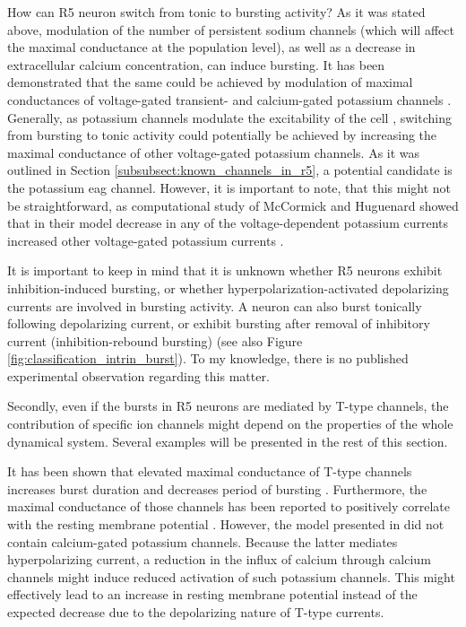 \documentclass[../main.tex]{subfiles}
\begin{document}
\vspace*{0.5cm}

How can R5 neuron switch from tonic to bursting activity? As it was stated above, modulation of the number of persistent sodium channels (which will affect the maximal conductance at the population level), as well as a decrease in extracellular calcium concentration, can induce bursting. It has been demonstrated that the same could be achieved by modulation of maximal conductances of voltage-gated transient- and calcium-gated potassium channels \cite{franciRobustTunableBursting2018}. Generally, as potassium channels modulate the excitability of the cell \cite{bruggemannEtheragogoEncodesVoltagegated1993}, switching from bursting to tonic activity could potentially be achieved by increasing the maximal conductance of other voltage-gated potassium channels. As it was outlined in Section \ref{subsubsect:known_channels_in_r5}, a potential candidate is the potassium \gls{eag} channel. However, it is important to note,
that this might not be straightforward, as computational study of McCormick and Huguenard showed that in their model decrease in any of the voltage-dependent potassium currents increased other voltage-gated potassium currents \cite{mccormickModelElectrophysiologicalProperties1992}.

\vspace*{0.5cm}

It is important to keep in mind that it is unknown whether R5 neurons exhibit inhibition-induced bursting, or whether hyperpolarization-activated depolarizing currents are involved in bursting activity. A neuron can also burst tonically following depolarizing current, or exhibit bursting after removal of inhibitory current (inhibition-rebound bursting) \cite{izhikevichDynamicalSystemsNeuroscience2006} (see also Figure \ref{fig:classification_intrin_burst}).
To my knowledge, there is no published experimental observation regarding this matter.

Secondly, even if the bursts in R5 neurons are mediated by T-type channels, the contribution of specific ion channels might depend on the properties of the whole dynamical system. Several examples will be presented in the rest of this section.

It has been shown that elevated maximal conductance of T-type channels increases burst duration and decreases period of bursting \cite{parkMathematicalModelSubthalamic2021}. Furthermore, the maximal conductance of those channels has been reported to positively correlate with the resting membrane potential \cite{amarilloInterplaySevenSubthreshold2014}. However, the model presented in \cite{amarilloInterplaySevenSubthreshold2014} did not contain calcium-gated potassium channels. Because the latter mediates hyperpolarizing current, a reduction in the influx of calcium through calcium channels might induce reduced activation of such potassium channels. This might effectively lead to an increase in resting membrane potential instead of the expected decrease due to the depolarizing nature of T-type currents.
\end{document}

